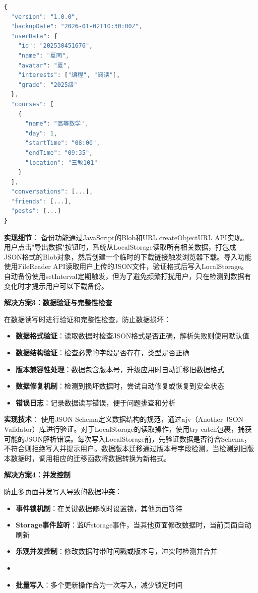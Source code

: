 \documentclass[12pt,a4paper]{article}
\begin{document}
\begin{lstlisting}[language=JavaScript]
{
  "version": "1.0.0",
  "backupDate": "2026-01-02T10:30:00Z",
  "userData": {
    "id": "202530451676",
    "name": "夏同",
    "avatar": "夏",
    "interests": ["编程", "阅读"],
    "grade": "2025级"
  },
  "courses": [
    {
      "name": "高等数学",
      "day": 1,
      "startTime": "08:00",
      "endTime": "09:35",
      "location": "三教101"
    }
  ],
  "conversations": [...],
  "friends": [...],
  "posts": [...]
}
\end{lstlisting}

\textbf{实现细节}：
备份功能通过JavaScript的Blob和URL.createObjectURL API实现。用户点击"导出数据"按钮时，系统从LocalStorage读取所有相关数据，打包成JSON格式的Blob对象，然后创建一个临时的下载链接触发浏览器下载。导入功能使用FileReader API读取用户上传的JSON文件，验证格式后写入LocalStorage。自动备份使用setInterval定期触发，但为了避免频繁打扰用户，只在检测到数据有变化时才提示用户可以下载备份。

\textbf{解决方案3：数据验证与完整性检查}

在数据读写时进行验证和完整性检查，防止数据损坏：

\begin{itemize}
    \item \textbf{数据格式验证}：读取数据时检查JSON格式是否正确，解析失败则使用默认值
    \item \textbf{数据结构验证}：检查必需的字段是否存在，类型是否正确
    \item \textbf{版本兼容性处理}：数据包含版本号，升级应用时自动迁移旧数据格式
    \item \textbf{数据修复机制}：检测到损坏数据时，尝试自动修复或恢复到安全状态
    \item \textbf{错误日志}：记录数据读写错误，便于问题排查和分析
\end{itemize}

\textbf{实现技术}：
使用JSON Schema定义数据结构的规范，通过ajv（Another JSON Validator）库进行验证。对于LocalStorage的读取操作，使用try-catch包裹，捕获可能的JSON解析错误。每次写入LocalStorage前，先验证数据是否符合Schema，不符合则拒绝写入并提示用户。数据版本迁移通过版本号字段检测，当检测到旧版本数据时，调用相应的迁移函数将数据转换为新格式。

\textbf{解决方案4：并发控制}

防止多页面并发写入导致的数据冲突：

\begin{itemize}
    \item \textbf{事件锁机制}：在关键数据修改时设置锁，其他页面等待
    \item \textbf{Storage事件监听}：监听storage事件，当其他页面修改数据时，当前页面自动刷新
    \item \textbf{乐观并发控制}：修改数据时带时间戳或版本号，冲突时检测并合并
    \item \item \textbf{批量写入}：多个更新操作合为一次写入，减少锁定时间
\end{itemize}
\end{document}
